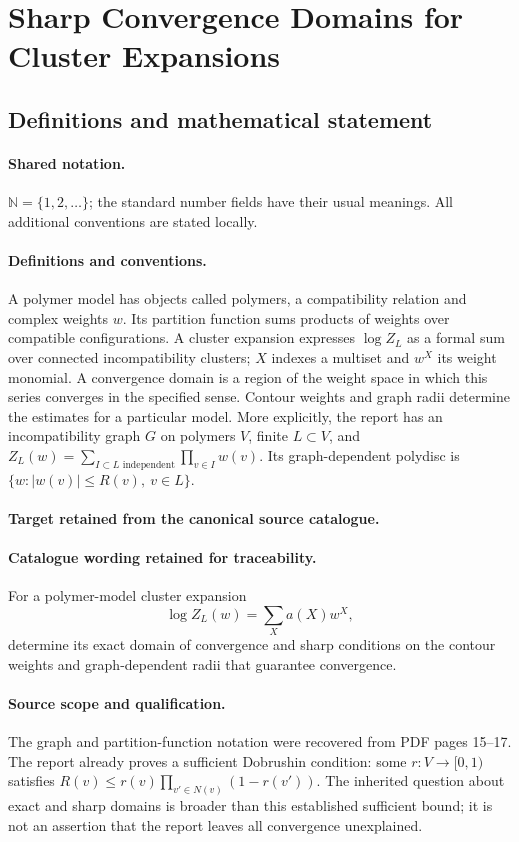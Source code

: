 \documentclass[11pt]{article}
\begin{document}
\section{Sharp Convergence Domains for Cluster Expansions}\label{statement}

\subsection{Definitions and mathematical statement}

\paragraph{Shared notation.}$\mathbb N=\{1,2,\ldots\}$; the standard number fields have their usual meanings. All additional conventions are stated locally.


\paragraph{Definitions and conventions.}
A polymer model has objects called polymers, a compatibility relation and complex weights $w$. Its partition function sums products of weights over compatible configurations. A cluster expansion expresses $\log Z_L$ as a formal sum over connected incompatibility clusters; $X$ indexes a multiset and $w^X$ its weight monomial. A convergence domain is a region of the weight space in which this series converges in the specified sense. Contour weights and graph radii determine the estimates for a particular model. More explicitly, the report has an incompatibility graph $G$ on polymers $V$, finite $L\subset V$, and $Z_L(w)=\sum_{I\subset L\text{ independent}}\prod_{v\in I}w(v)$. Its graph-dependent polydisc is $\{w:|w(v)|\leq R(v),\ v\in L\}$.

\paragraph{Target retained from the canonical source catalogue.}
\paragraph{Catalogue wording retained for traceability.}
For a polymer-model cluster expansion
$$
\log Z_L(w)=\sum_X a(X)w^X,
$$
determine its exact domain of convergence and sharp conditions on the contour weights and graph-dependent radii that guarantee convergence.

\paragraph{Source scope and qualification.}
The graph and partition-function notation were recovered from PDF pages 15--17. The report already proves a sufficient Dobrushin condition: some $r:V\to[0,1)$ satisfies $R(v)\leq r(v)\prod_{v'\in N(v)}(1-r(v'))$. The inherited question about exact and sharp domains is broader than this established sufficient bound; it is not an assertion that the report leaves all convergence unexplained.
\end{document}
